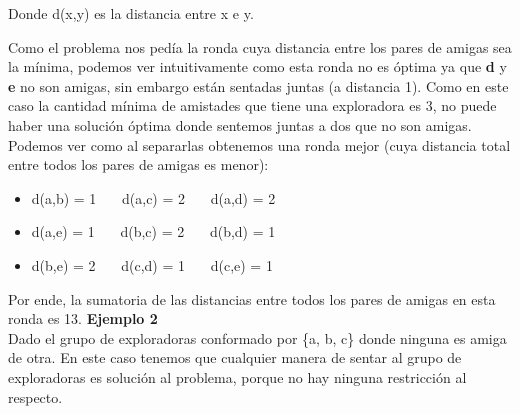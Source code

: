 \documentclass[11pt]{article}
\begin{document}
Donde d(x,y) es la distancia entre x e y.

Como el problema nos pedía la ronda cuya distancia entre los pares de amigas sea la mínima, podemos 
ver intuitivamente como esta ronda no es óptima ya que \textbf{d} y \textbf{e} no son amigas, sin embargo
están sentadas juntas (a distancia 1). Como en este caso la cantidad mínima de amistades que tiene
una exploradora es 3, no puede haber una solución óptima donde sentemos juntas a dos que no son amigas.
Podemos ver como al separarlas obtenemos una ronda mejor (cuya distancia total entre todos los
pares de amigas es menor):

\begin{figure}[H]
\begin{center}
\end{center}
\end{figure}

\begin{itemize}
  \item d(a,b) = 1   \ \ \ \inlineitem d(a,c) = 2 \ \ \ \inlineitem d(a,d) = 2
  \item d(a,e) = 1   \ \ \ \inlineitem d(b,c) = 2 \ \ \ \inlineitem d(b,d) = 1
  \item d(b,e) = 2   \ \ \ \inlineitem d(c,d) = 1 \ \ \ \inlineitem d(c,e) = 1
\end{itemize}

Por ende, la sumatoria de las distancias entre todos los pares de amigas en esta ronda es 13.
\vspace{2mm}
\textbf{Ejemplo 2}\\
\vspace{2mm}
Dado el grupo de exploradoras conformado por \{a, b, c\} donde ninguna es amiga de otra. En este caso tenemos que 
cualquier manera de sentar al grupo de exploradoras es solución al problema, porque no hay ninguna restricción al respecto.
\end{document}
